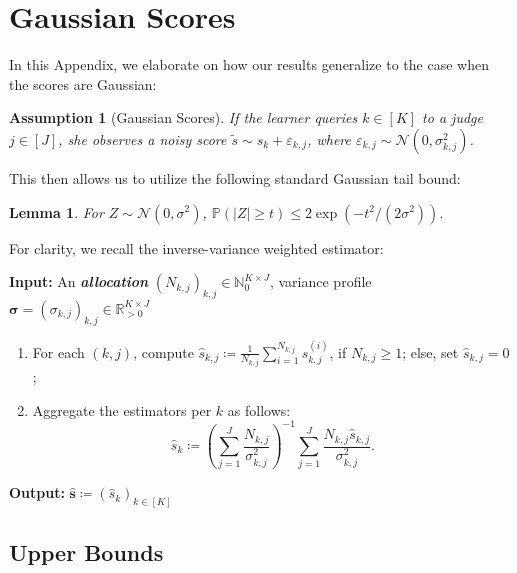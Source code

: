 \documentclass{article}
\def\vs{{\bm{s}}}
\def\gN{{\mathcal{N}}}
\def\sN{{\mathbb{N}}}
\def\sP{{\mathbb{P}}}
\def\sR{{\mathbb{R}}}
\theoremstyle{plain}
\newtheorem{lemma}[theorem]{Lemma}
\theoremstyle{definition}
\theoremstyle{plain}
\newtheorem{assumption}{Assumption}
\begin{document}
\newpage
\section{Gaussian Scores}
\label{app:gaussian}

In this Appendix, we elaborate on how our results generalize to the case when the scores are Gaussian:
\begin{assumption}[Gaussian Scores]\label{assumption:gauss}
    If the learner queries $k\in[K]$ to a judge $j\in[J]$, she observes a noisy score $\tilde{s} \sim s_{k} + \varepsilon_{k, j}$, where $\varepsilon_{k,j}\sim\gN(0 , \sigma_{k,j}^2)$.
\end{assumption}
This then allows us to utilize the following standard Gaussian tail bound:
\begin{lemma}
\label{lem:gaussian}
    For $Z \sim \gN(0, \sigma^2)$, $\sP\left( |Z| \geq t \right) \leq 2 \exp\left( - t^2 / (2 \sigma^2) \right).$
\end{lemma}

For clarity, we recall the inverse-variance weighted estimator:
\begin{tcolorbox}[algobox,title=Inverse-Variance Weighted Estimator (IVWE)]
\textbf{Input:} An \textbf{\emph{allocation}} $(N_{k,j})_{k,j} \in \sN_0^{K \times J}$, variance profile $\bm\sigma = (\sigma_{k,j})_{k,j} \in \sR_{> 0}^{K \times J}$
\begin{enumerate}
    \item For each $(k, j)$, compute $\hat{s}_{k,j} \coloneq \frac{1}{N_{k,j}} \sum_{i=1}^{N_{k,j}} {s}_{k,j}^{(i)}$, if $N_{k,j} \geq 1$; else, set $\hat{s}_{k,j} = 0$;
    \item Aggregate the estimators per $k$ as follows:
    \begin{equation}
        \hat{s}_k \coloneq \left( \sum_{j=1}^J \frac{N_{k,j}}{\sigma_{k,j}^2} \right)^{-1} \sum_{j=1}^J \frac{N_{k,j} \hat{s}_{k,j}}{\sigma_{k,j}^2}.
    \end{equation}
\end{enumerate}
\textbf{Output:} $\hat{\vs} \coloneq (\hat{s}_k)_{k \in [K]}$
\end{tcolorbox}

\subsection{Upper Bounds}
\end{document}
